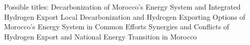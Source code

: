 Possible titles:
Decarbonization of Morocco’s Energy System and Integrated Hydrogen Export
Local Decarbonization and Hydrogen Exporting Options of Morocco’s Energy System in Common Efforts
Synergies and Conflicts of Hydrogen Export and National Energy Transition in Morocco